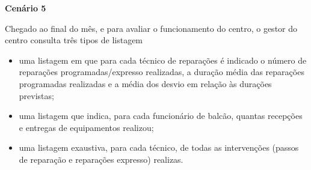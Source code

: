 \documentclass[../relatorio.tex]{subfiles}
\begin{document}
\textbf{Cenário 5} \label{cenario_5}

Chegado ao final do mês, e para avaliar o funcionamento do centro, o gestor do centro consulta três tipos de listagem

\begin{itemize}
    \item uma listagem em que para cada técnico de reparações é indicado o número de reparações programadas/expresso realizadas, a duração média
          das reparações programadas realizadas e a média dos desvio em relação
          às durações previstas;
    \item uma listagem que indica, para cada funcionário de balcão, quantas recepções e entregas de equipamentos realizou;
    \item uma listagem exaustiva, para cada técnico, de todas as intervenções (passos de reparação e reparações expresso) realizas.
\end{itemize}
\end{document}
